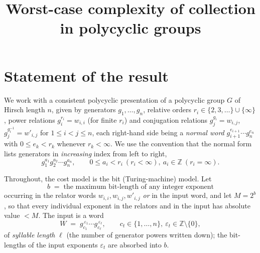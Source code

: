 \documentclass{amsart}
\theoremstyle{definition}
\begin{document}
\title{Worst-case complexity of collection in polycyclic groups}
\maketitle

\section{Statement of the result}

We work with a consistent polycyclic presentation of a polycyclic group $G$ of
Hirsch length $n$, given by generators $g_1,\dots,g_n$, relative orders
$r_i\in\{2,3,\dots\}\cup\{\infty\}$, power relations $g_i^{r_i}=w_{i,i}$ (for finite
$r_i$) and conjugation relations $g_j^{g_i}=w_{i,j}$, $g_j^{g_i^{-1}}=w'_{i,j}$ for
$1\le i<j\le n$, each right-hand side being a \emph{normal word}
$g_{i+1}^{e_{i+1}}\cdots g_n^{e_n}$ with $0\le e_k<r_k$ whenever $r_k<\infty$. We use
the convention that the normal form lists generators in \emph{increasing} index from
left to right,
\[
g_1^{a_1}g_2^{a_2}\cdots g_n^{a_n},\qquad 0\le a_i<r_i\ (r_i<\infty),\ a_i\in\mathbb Z\ (r_i=\infty).
\]

Throughout, the cost model is the bit (Turing-machine) model. Let
\[
b \;=\; \text{the maximum bit-length of any integer exponent}
\]
occurring in the relator words $w_{i,i},w_{i,j},w'_{i,j}$ \emph{or} in the input word,
and let $M=2^{b}$, so that every individual exponent in the relators and in the input has
absolute value $<M$. The input is a word
\[
W \;=\; g_{c_1}^{\,\varepsilon_1}\cdots g_{c_\ell}^{\,\varepsilon_\ell},
\qquad c_t\in\{1,\dots,n\},\ \varepsilon_t\in\mathbb Z\setminus\{0\},
\]
of \emph{syllable length} $\ell$ (the number of generator powers written down); the
bit-lengths of the input exponents $\varepsilon_t$ are absorbed into $b$.
\end{document}
